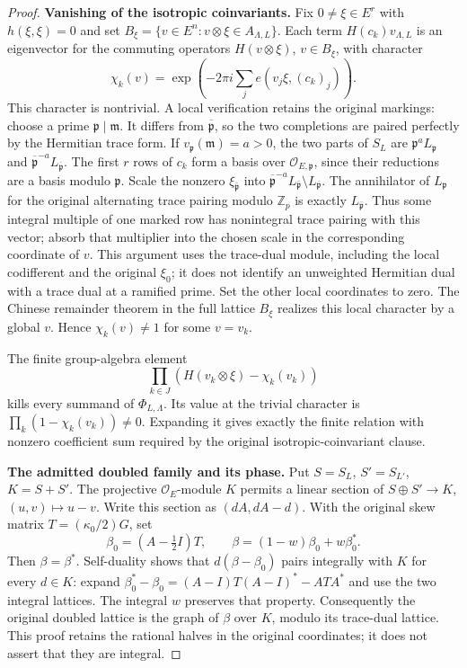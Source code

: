 \begin{proof}
\textbf{Vanishing of the isotropic coinvariants.}
Fix $0\ne\xi\in E^r$ with $h(\xi,\xi)=0$ and set
$B_\xi=\{v\in E^n:v\otimes\xi\in A_{\Lambda,L}\}$.
Each term $H(c_k)v_{\Lambda,L}$ is an eigenvector for the commuting
operators $H(v\otimes\xi)$, $v\in B_\xi$, with character
\[
 \chi_k(v)=\exp\!\left(-2\pi i\sum_j e(v_j\xi,(c_k)_j)\right).
\]
This character is nontrivial. A local verification retains the
original markings: choose a prime $\mathfrak p\mid\mathfrak m$.
It differs from $\overline{\mathfrak p}$, so the two completions
are paired perfectly by the Hermitian trace form. If
$v_{\mathfrak p}(\mathfrak m)=a>0$, the two parts of $S_L$ are
$\mathfrak p^aL_{\mathfrak p}$ and
$\overline{\mathfrak p}^{-a}L_{\overline{\mathfrak p}}$.
The first $r$ rows of $c_k$ form a basis over
$\mathcal O_{E,\mathfrak p}$, since their reductions are a basis
modulo $\mathfrak p$. Scale the nonzero
$\xi_{\overline{\mathfrak p}}$ into
$\overline{\mathfrak p}^{-a}L_{\overline{\mathfrak p}}
\setminus L_{\overline{\mathfrak p}}$.
The annihilator of $L_{\mathfrak p}$ for the original alternating
trace pairing modulo $\mathbb Z_p$ is exactly
$L_{\overline{\mathfrak p}}$. Thus some integral multiple of
one marked row has nonintegral trace pairing with this vector;
absorb that multiplier into the chosen scale in the corresponding
coordinate of $v$. This argument uses the trace-dual module,
including the local codifferent and the original $\xi_0$;
it does not identify an unweighted Hermitian dual with a trace
dual at a ramified prime. Set the other local coordinates to zero.
The Chinese remainder theorem in the full lattice $B_\xi$
realizes this local character by a global $v$. Hence
$\chi_k(v)\ne1$ for some $v=v_k$.

The finite group-algebra element
\[
                 \prod_{k\in J}(H(v_k\otimes\xi)-\chi_k(v_k))
\]
kills every summand of $\Phi_{L,\Lambda}$. Its value at the
trivial character is $\prod_k(1-\chi_k(v_k))\ne0$. Expanding
it gives exactly the finite relation with nonzero coefficient sum
required by the original isotropic-coinvariant clause.

\textbf{The admitted doubled family and its phase.}
Put $S=S_L$, $S'=S_{L'}$, $K=S+S'$. The projective
$\mathcal O_E$-module $K$ permits a linear section of
$S\oplus S'\to K$, $(u,v)\mapsto u-v$. Write this section as
$(dA,dA-d)$. With the original skew matrix
$T=(\kappa_0/2)G$, set
\[
 \beta_0=(A-\tfrac12 I)T,
 \qquad\beta=(1-w)\beta_0+w\beta_0^*.
\]
Then $\beta=\beta^*$. Self-duality shows that
$d(\beta-\beta_0)$ pairs integrally with $K$ for every $d\in K$:
expand
$\beta_0^*-\beta_0=(A-I)T(A-I)^*-ATA^*$ and use the two
integral lattices. The integral $w$ preserves that property.
Consequently the original doubled lattice is the graph of
$\beta$ over $K$, modulo its trace-dual lattice. This proof retains
the rational halves in the original coordinates; it does not
assert that they are integral.


\end{proof}
